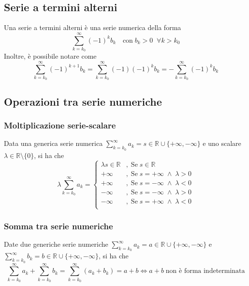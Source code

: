         \subsection{Serie a termini alterni}
            Una serie a termini alterni è una serie numerica della forma
            \[
                \sum_{k = k_{0}}^{\infty} (-1)^{k} b_{k} \quad \text{con} \; b_{k} > 0 \;\; \forall k > k_{0}
            \]
            Inoltre, è possibile notare come
            \[
                \sum_{k = k_{0}}^{\infty} (-1)^{k + 1} b_{k} = \sum_{k = k_{0}}^{\infty} (-1)(-1)^{k} b_{k} = - \sum_{k = k_{0}}^{\infty} (-1)^{k} b_{k}
            \]



        \subsection{Operazioni tra serie numeriche}
            \subsubsection{Moltiplicazione serie-scalare}
                Data una generica serie numerica $\sum_{k = k_{0}}^{\infty} a_{k} = s \in \mathbb{R} \cup \{+\infty, -\infty\}$ e uno scalare $\lambda \in \mathbb{R} \setminus \{0\}$, si ha che
                \[
                    \lambda \sum_{k = k_{0}}^{\infty} a_{k} =
                    \begin{cases}
                        \lambda s \in \mathbb{R} &, \; \text{Se} \; s \in \mathbb{R} \\
                        +\infty                  &, \; \text{Se} \; s = +\infty \; \land \; \lambda > 0 \\
                        +\infty                  &, \; \text{Se} \; s = -\infty \; \land \; \lambda < 0 \\
                        -\infty                  &, \; \text{Se} \; s = -\infty \; \land \; \lambda > 0 \\
                        -\infty                  &, \; \text{Se} \; s = +\infty \; \land \; \lambda < 0 \\
                    \end{cases}
                \]

            \subsubsection{Somma tra serie numeriche}
                Date due generiche serie numeriche $\sum_{k = k_{0}}^{\infty} a_{k} = a \in \mathbb{R} \cup \{+\infty, -\infty\}$ e $\sum_{k = k_{0}}^{\infty} b_{k} = b \in \mathbb{R} \cup \{+\infty, -\infty\}$, si ha che
                \[
                    \sum_{k = k_{0}}^{\infty} a_{k} + \sum_{k = k_{0}}^{\infty} b_{k} = \sum_{k = k_{0}}^{\infty} (a_{k} + b_{k}) = a + b \iff a + b \; \text{non è forma indeterminata}
                \]




